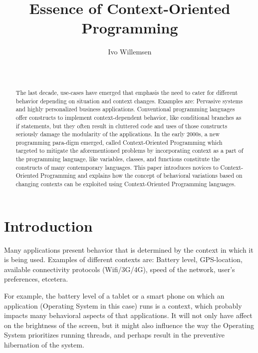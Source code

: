 \documentclass{acm_proc_article-sp}
\begin{document}
\title{Essence of Context-Oriented Programming}

\author{
\alignauthor
Ivo Willemsen\\
       \\
       \\
}

\maketitle
\begin{abstract}
The last decade, use-cases have emerged that emphasis the need to cater for different behavior depending on situation and context changes. Examples are: Pervasive systems and highly personalized business applications. Conventional programming languages offer constructs to implement context-dependent behavior, like  conditional branches as if statements, but they often result in cluttered code and uses of those 
constructs seriously damage the modularity of the applications. In the early 2000s, a new programming para-\linebreak digm emerged, called Context-Oriented Programming which targeted to mitigate the aforementioned problems by incorporating context as a part of the programming language, like variables, classes, and functions constitute the constructs of many contemporary languages. This paper introduces novices to Context-Oriented Programming and explains how the concept of behavioral variations based on changing contexts can be exploited using Context-Oriented Programming languages.
\end{abstract}


\section{Introduction} \label{introduction}
Many applications present behavior that is determined by the context in which it is being used. Examples of different contexts are: Battery level, GPS-location, available connectivity protocols (Wifi/3G/4G), speed of the network, user's preferences, etcetera.

For example, the battery level of a tablet or a smart phone on which an application (Operating System in this case) runs is a context, which probably impacts many behavioral aspects of that applications. It will not only have affect on the brightness of the screen, but it might also influence the way the Operating System prioritizes running threads, and perhaps result in the preventive hibernation of the system.
\end{document}
